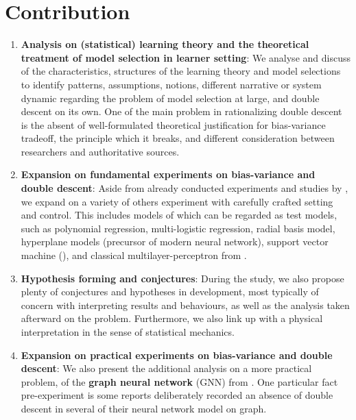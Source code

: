 \documentclass[10pt,oneside,oldfontcommands,dvipsnames,article]{memoir}
\begin{document}
\section{Contribution}
\begin{enumerate}[topsep=1pt,itemsep=0.6pt,leftmargin=*]
  \item \textbf{Analysis on (statistical) learning theory and the theoretical treatment of model selection in learner setting}: We analyse and discuss of the characteristics, structures of the learning theory and model selections to identify patterns, assumptions, notions, different narrative or system dynamic regarding the problem of model selection at large, and double descent on its own. One of the main problem in rationalizing double descent is the absent of well-formulated theoretical justification for bias-variance tradeoff, the principle which it breaks, and different consideration between researchers and authoritative sources. 
  \item \textbf{Expansion on fundamental experiments on bias-variance and double descent}: Aside from already conducted experiments and studies by \cite{sharma_bias-variance_2014,schaeffer_double_2023,nakkiran_deep_2019,belkin_reconciling_2019,6797087,unified_bias_composition,Scott_Fortmann_Bias,neal2019biasvariancetradeofftextbooksneed}, we expand on a variety of others experiment with carefully crafted setting and control. This includes models of which can be regarded as test models, such as polynomial regression, multi-logistic regression, radial basis model, hyperplane models (precursor of modern neural network), support vector machine (\cite{Cristianini2000AnIT}), and classical multilayer-perceptron from \cite{goodfellow2016deep}. 
  \item \textbf{Hypothesis forming and conjectures}: During the study, we also propose plenty of conjectures and hypotheses in development, most typically of concern with interpreting results and behaviours, as well as the analysis taken afterward on the problem. Furthermore, we also link up with a physical interpretation in the sense of statistical mechanics. 
  \item \textbf{Expansion on practical experiments on bias-variance and double descent}: We also present the additional analysis on a more practical problem, of the \textbf{graph neural network} (GNN) from \cite{GRP_Hamilton,Scar04,lopushanskyy2024graphneuralnetworksgraph,tanis2024introductiongraphneuralnetworks,bronstein2021geometricdeeplearninggrids,Veli_kovi__2023}. One particular fact pre-experiment is some reports deliberately recorded an absence of double descent in several of their neural network model on graph. 
\end{enumerate}
\end{document}
